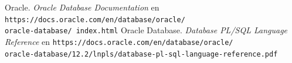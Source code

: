 \documentclass{article}
\begin{document}
\renewcommand\refname{Bibliografía}
\begin{thebibliography}{99}
     Oracle. \textit{Oracle Database Documentation} en 
        \texttt{https://docs.oracle.com/en/database/oracle/\\oracle-database/%
        index.html}
     Oracle Database. \textit{Database PL/SQL Language 
        Reference} en 
        \texttt{https://docs.oracle.com/en/database/oracle/\\
        oracle-database/12.2/lnpls/database-pl-sql-language-reference.pdf}
\end{thebibliography}
\end{document}
